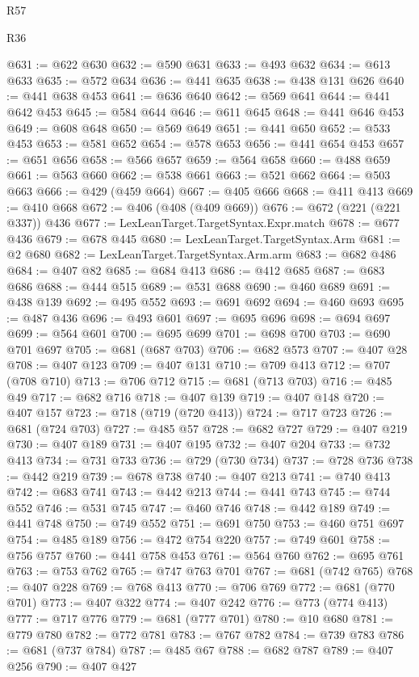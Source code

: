 \begin{lexlean}{R57}
\begin{lexlean}{R36}
\begin{coremodule}
{{{{{{{{{{{{{{{{{{{{{{{{{{{{{{{{{{{{{{{{{{{{{{{{{{{{{{{{{{{{{{{{{{{{{{{{{{{{{{{{{{@631 := @622 @630
@632 := @590 @631
@633 := @493 @632
@634 := @613 @633
@635 := @572 @634
@636 := @441 @635
@638 := @438 @131 @626
@640 := @441 @638 @453
@641 := @636 @640
@642 := @569 @641
@644 := @441 @642 @453
@645 := @584 @644
@646 := @611 @645
@648 := @441 @646 @453
@649 := @608 @648
@650 := @569 @649
@651 := @441 @650
@652 := @533 @453
@653 := @581 @652
@654 := @578 @653
@656 := @441 @654 @453
@657 := @651 @656
@658 := @566 @657
@659 := @564 @658
@660 := @488 @659
@661 := @563 @660
@662 := @538 @661
@663 := @521 @662
@664 := @503 @663
@666 := @429 (@459 @664)
@667 := @405 @666
@668 := @411 @413
@669 := @410 @668
@672 := @406 (@408 (@409 @669))
@676 := @672 (@221 (@221 @337)) @436
@677 := LexLeanTarget.TargetSyntax.Expr.match
@678 := @677 @436
@679 := @678 @445
@680 := LexLeanTarget.TargetSyntax.Arm
@681 := @2 @680
@682 := LexLeanTarget.TargetSyntax.Arm.arm
@683 := @682 @486
@684 := @407 @82
@685 := @684 @413
@686 := @412 @685
@687 := @683 @686
@688 := @444 @515
@689 := @531 @688
@690 := @460 @689
@691 := @438 @139
@692 := @495 @552
@693 := @691 @692
@694 := @460 @693
@695 := @487 @436
@696 := @493 @601
@697 := @695 @696
@698 := @694 @697
@699 := @564 @601
@700 := @695 @699
@701 := @698 @700
@703 := @690 @701 @697
@705 := @681 (@687 @703)
@706 := @682 @573
@707 := @407 @28
@708 := @407 @123
@709 := @407 @131
@710 := @709 @413
@712 := @707 (@708 @710)
@713 := @706 @712
@715 := @681 (@713 @703)
@716 := @485 @49
@717 := @682 @716
@718 := @407 @139
@719 := @407 @148
@720 := @407 @157
@723 := @718 (@719 (@720 @413))
@724 := @717 @723
@726 := @681 (@724 @703)
@727 := @485 @57
@728 := @682 @727
@729 := @407 @219
@730 := @407 @189
@731 := @407 @195
@732 := @407 @204
@733 := @732 @413
@734 := @731 @733
@736 := @729 (@730 @734)
@737 := @728 @736
@738 := @442 @219
@739 := @678 @738
@740 := @407 @213
@741 := @740 @413
@742 := @683 @741
@743 := @442 @213
@744 := @441 @743
@745 := @744 @552
@746 := @531 @745
@747 := @460 @746
@748 := @442 @189
@749 := @441 @748
@750 := @749 @552
@751 := @691 @750
@753 := @460 @751 @697
@754 := @485 @189
@756 := @472 @754 @220
@757 := @749 @601
@758 := @756 @757
@760 := @441 @758 @453
@761 := @564 @760
@762 := @695 @761
@763 := @753 @762
@765 := @747 @763 @701
@767 := @681 (@742 @765)
@768 := @407 @228
@769 := @768 @413
@770 := @706 @769
@772 := @681 (@770 @701)
@773 := @407 @322
@774 := @407 @242
@776 := @773 (@774 @413)
@777 := @717 @776
@779 := @681 (@777 @701)
@780 := @10 @680
@781 := @779 @780
@782 := @772 @781
@783 := @767 @782
@784 := @739 @783
@786 := @681 (@737 @784)
@787 := @485 @67
@788 := @682 @787
@789 := @407 @256
@790 := @407 @427
}}}}}}}}}}}}}}}}}}}}}}}}}}}}}}}}}}}}}}}}}}}}}}}}}}}}}}}}}}}}}}}}}}}}}}}}}}}}}}}}}}
\end{coremodule}
\end{lexlean}
\end{lexlean}
